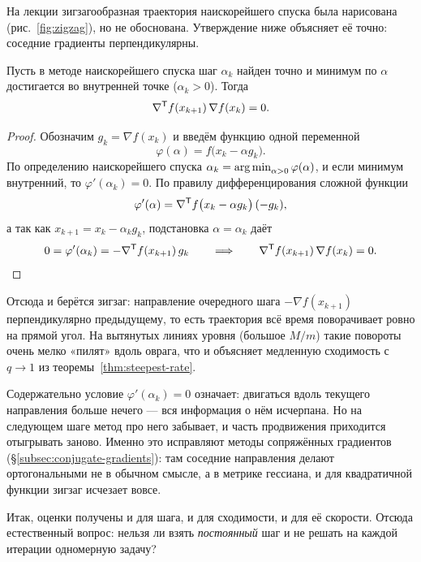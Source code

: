 \begin{idea}[title={Откуда этот материал}]
На лекции зигзагообразная траектория наискорейшего спуска была нарисована
(рис.~\ref{fig:zigzag}), но не обоснована. Утверждение ниже объясняет её
точно: соседние градиенты перпендикулярны.
\end{idea}

\begin{theorem}\label{thm:steepest-orthogonal}
Пусть в методе наискорейшего спуска шаг $\alpha_k$ найден точно и минимум по
$\alpha$ достигается во внутренней точке ($\alpha_k > 0$). Тогда
\[
  \nabla^{\mathsf{T}} f(x_{k+1})\,\nabla f(x_k) = 0 .
\]
\end{theorem}

\begin{proof}
Обозначим $g_k = \nabla f(x_k)$ и введём функцию одной переменной
\[
  \varphi(\alpha) = f\big(x_k - \alpha g_k\big) .
\]
По определению наискорейшего спуска $\alpha_k = \operatorname*{arg\,min}_{\alpha > 0}
\varphi(\alpha)$, и если минимум внутренний, то $\varphi'(\alpha_k) = 0$. По
правилу дифференцирования сложной функции
\[
  \varphi'(\alpha) = \nabla^{\mathsf{T}} f\big(x_k - \alpha g_k\big)\,(-g_k) ,
\]
а так как $x_{k+1} = x_k - \alpha_k g_k$, подстановка $\alpha = \alpha_k$ даёт
\[
  0 = \varphi'(\alpha_k) = -\nabla^{\mathsf{T}} f(x_{k+1})\, g_k
  \qquad\Longrightarrow\qquad
  \nabla^{\mathsf{T}} f(x_{k+1})\,\nabla f(x_k) = 0 . \qedhere
\]
\end{proof}

\begin{idea}
Отсюда и берётся зигзаг: направление очередного шага $-\nabla f(x_{k+1})$
перпендикулярно предыдущему, то есть траектория всё время поворачивает ровно на
прямой угол. На вытянутых линиях уровня (большое $M/m$) такие повороты очень
мелко «пилят» вдоль оврага, что и объясняет медленную сходимость с
$q \to 1$ из теоремы~\ref{thm:steepest-rate}.

Содержательно условие $\varphi'(\alpha_k) = 0$ означает: двигаться вдоль
текущего направления больше нечего — вся информация о нём исчерпана. Но на
следующем шаге метод про него забывает, и часть продвижения приходится
отыгрывать заново. Именно это исправляют методы сопряжённых градиентов
(\S\ref{subsec:conjugate-gradients}): там соседние направления делают
ортогональными не в обычном смысле, а в метрике гессиана, и для квадратичной
функции зигзаг исчезает вовсе.
\end{idea}

Итак, оценки получены и для шага, и для сходимости, и для её скорости. Отсюда
естественный вопрос: нельзя ли взять \emph{постоянный} шаг и не решать на каждой
итерации одномерную задачу?
